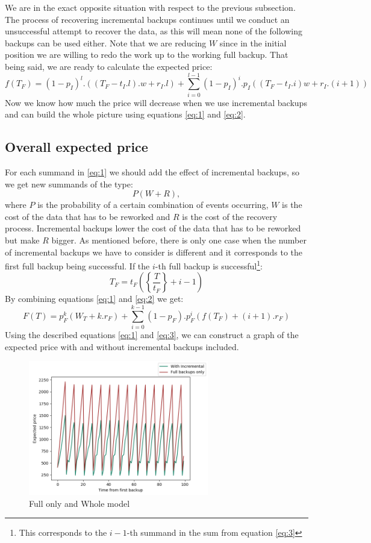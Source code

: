 \documentclass[11pt, a4paper]{article}
\theoremstyle{definition}
\begin{document}
We are in the exact opposite situation with respect to the previous subsection. The process of recovering incremental backups continues until we conduct an unsuccessful attempt to recover the data, as this will mean none of the following backups can be used either. Note that we are reducing $W$ since in the initial position we are willing to redo the work up to the working full backup. That being said, we are ready to calculate the expected price:
\begin{equation}
\label{eq:2}
f(T_F) = (1-p_I)^l.((T_F-t_I.l).w + r_I.l) + \displaystyle \sum_{i=0}^{l-1} (1-p_I)^{i}.p_I((T_F-t_I.i)w + r_I.(i+1))
\end{equation}
Now we know how much the price will decrease when we use incremental backups and can build the whole picture using equations \ref{eq:1} and \ref{eq:2}.
\subsection{Overall expected price}
For each summand in \ref{eq:1} we should add the effect of incremental backups, so we get new summands of the type:
$$
P(W + R),
$$
where $P$ is the probability of a certain combination of events occurring, $W$ is the cost of the data that has to be reworked and $R$ is the cost of the recovery process. Incremental backups lower the cost of the data that has to be reworked but make $R$ bigger. As mentioned before, there is only one case when the number of incremental backups we have to consider is different and it corresponds to the first full backup being successful. If the $i$-th full backup is successful\footnote{This corresponds to the $i-1$-th summand in the sum from equation \ref{eq:3}}:
$$
T_F=t_F\left(\left\{ \frac{T}{t_F} \right\} + i - 1\right)
$$
By combining equations \ref{eq:1} and \ref{eq:2} we get:
\begin{equation}\label{eq:3}
F(T) = p_F^{k}(W_T+k.r_F) + \displaystyle\sum_{i=0}^{k-1}(1-p_F).p_F^{i}\left(f(T_F) + (i+1).r_F\right)
\end{equation}
Using the described equations \ref{eq:1} and \ref{eq:3}, we can construct a graph of the expected price with and without incremental backups included.
\begin{figure}[H]
	\begin{minipage}{1.0\textwidth}
		\centering
		\includegraphics[width=0.7\textwidth]{Weekly_full.png}
		\caption{Full only and Whole model}\label{Fig:FullWeekly}
	\end{minipage}
\end{figure}
\end{document}
